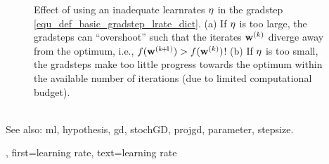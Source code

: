 {{\begin{figure}[hbtp]
\begin{center}
\begin{minipage}{0.45\columnwidth}
			\end{minipage}
		\end{center}
		\caption{Effect of using an inadequate \glspl{learnrate} $\eta$ in the \gls{gradstep} 
		         \eqref{equ_def_basic_gradstep_lrate_dict}. (a) If $\eta$ is too large, 
				 the \glspl{gradstep} can ``overshoot'' such that the iterates ${\bf w}^{(k)}$ 
				 diverge away from the optimum, i.e., $f({\bf w}^{(k\!+\!1)}) > f({\bf w}^{(k)})$! 
		(b) If $\eta$ is too small, the \glspl{gradstep} make too little progress towards 
		the optimum within the available number of iterations (due to limited computational budget). 
		\label{fig_small_large_lrate_dict}}
		\end{figure}
				\\
		See also: \gls{ml}, \gls{hypothesis}, \gls{gd}, \gls{stochGD}, \gls{projgd}, \gls{parameter}, \gls{stepsize}.},
	first={learning rate},
	text={learning rate} 
}

